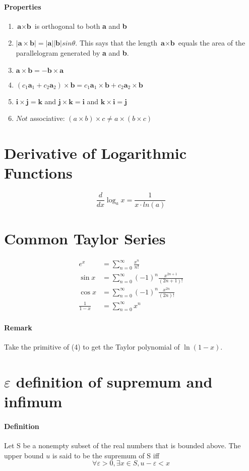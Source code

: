 \documentclass[11pt]{article}
\newcommand{\tb}[1]{\textbf{#1}}
\begin{document}
\paragraph{Properties}
\begin{enumerate}
	\item $\tb{a} \times \tb{b}$ is orthogonal to both \tb{a} and \tb{b}
	\item $|\tb{a} \times \tb{b}| = |\tb{a}||\tb{b}|sin\theta$. This says that the length $\tb{a} \times \tb{b}$ equals the area of the parallelogram generated by \tb{a} and \tb{b}.
	\item $\tb{a} \times \tb{b} = -\tb{b} \times \tb{a}$
	\item $(c_1\tb{a}_1 + c_2\tb{a}_2) \times \tb{b} = c_1\tb{a}_1 \times \tb{b} + c_2\tb{a}_2 \times \tb{b}$
	\item $\tb{i} \times \tb{j} = \tb{k}$ and $\tb{j} \times \tb{k} = \tb{i}$ and $\tb{k} \times \tb{i} = \tb{j}$
	\item $Not$ associative: $(a \times b) \times c \neq a \times (b \times c)$
\end{enumerate} 
\section{Derivative of Logarithmic Functions}
$$\frac{d}{dx}\log_a{x} = \frac{1}{x \cdot ln(a)}$$

\section{Common Taylor Series}
\begin{align}
	e^x &= \sum_{n=0}^{\infty}\frac{x^n}{n!}\\
	\sin{x} &= \sum_{n=0}^{\infty}(-1)^n\frac{x^{2n+1}}{(2n+1)!}\\
	\cos{x} &= \sum_{n=0}^{\infty}(-1)^n\frac{x^{2n}}{(2n)!}\\
	\frac{1}{1-x} &= \sum_{n=0}^{\infty}x^n
\end{align}
\paragraph{Remark}
Take the primitive of (4) to get the Taylor polynomial of $\ln(1-x)$.
\section{$\varepsilon$ definition of supremum and infimum}
\paragraph{Definition} Let S be a nonempty subset of the real numbers that is bounded above. The upper bound $u$ is said to be the supremum of S iff $$\forall \varepsilon >0, \exists x \in S, u - \varepsilon < x$$
\end{document}
